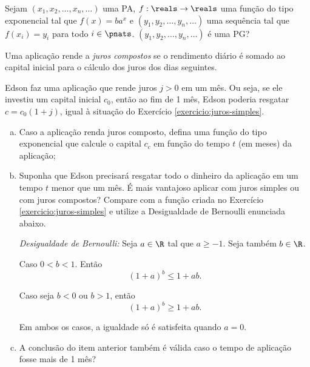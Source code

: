 \begin{exercise}
  Sejam $(x_1,x_2,\dots,x_n,\dots)$ uma PA, $f:\reals \to \reals$ uma função do 
  tipo exponencial tal que $f(x)=ba^x$ e $(y_1,y_2,\dots,y_n,\dots)$ uma sequência
  tal que $f(x_i)=y_i$ para todo $i\in\pnats$. $(y_1,y_2,\dots,y_n,\dots)$ é uma PG?
\end{exercise}

\begin{exercise}
    Uma aplicação rende a \emph{juros compostos} se o rendimento diário é somado ao capital inicial para o cálculo dos juros dos dias seguintes.
    
    Edson faz uma aplicação que rende juros $j>0$ em um mês. Ou seja, se ele investiu um capital inicial $c_0$, então ao fim de 1 mês, Edson poderia resgatar $c = c_0(1+j)$, igual à situação do Exercício \ref{exercicio:juros-simples}.
    \begin{enumerate}[a)]
        \item Caso a aplicação renda juros composto, defina uma função do tipo exponencial que calcule o capital $c_c$ em função do tempo $t$ (em meses) da aplicação;
        \item Suponha que Edson precisará resgatar todo o dinheiro da aplicação em um tempo $t$ menor que um mês. É mais vantajoso aplicar com juros simples ou com juros compostos? Compare com a função criada no Exercício \ref{exercicio:juros-simples} e utilize a Desigualdade de Bernoulli enunciada abaixo.

        \emph{Desigualdade de Bernoulli:}
        Seja $a \in \R$ tal que $a \geq -1$. Seja também $b \in \R$.
        
         Caso $0 < b < 1$. Então $$(1+a)^b \leq 1 + ab.$$
        
         Caso seja $b<0$ ou $b>1$, então $$(1+a)^b \geq 1 + ab.$$
        
         Em ambos os casos, a igualdade só é satisfeita quando $a=0$.
        \item A conclusão do item anterior também é válida caso o tempo de aplicação fosse mais de 1 mês?
\end{enumerate}
\end{exercise}

